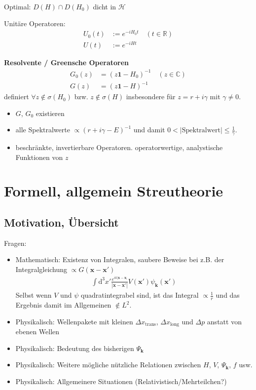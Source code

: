 \documentclass[11pt,a4paper]{report}
\begin{document}
Optimal: $D(H) \cap D(H_0)$ dicht in $\mathcal{H}$

Unitäre Operatoren: 
\begin{align*}
    U_0(t) &:= e^{-i H_0 t} \quad (t\in \mathbb{R}) \\
    U(t) &:= e^{-i H t}
\end{align*}

\textbf{Resolvente / Greensche Operatoren}
\begin{align*}
    G_0(z) &= (z \mathbf{1} - H_0)^{-1} \quad (z \in \mathbb{C}) \\
    G(z) &= (z \mathbf{1} - H)^{-1} 
\end{align*}
definiert $\forall z \notin \sigma(H_0)$ bzw. $z \notin \sigma(H)$ insbesondere für $z = r + i \gamma$ mit $\gamma \neq 0$.
\begin{itemize}
    \item $G$, $G_0$ existieren
    \item alle Spektralwerte $\propto (r + i \gamma - E)^{-1}$ und damit $0 < |\text{Spektralwert}| \leq \frac{1}{\gamma}$.
    \item beschränkte, invertierbare Operatoren. operatorwertige, analystische Funktionen von $z$
\end{itemize}

\section{Formell, allgemein Streutheorie}

\subsection{Motivation, Übersicht}

Fragen: 
\begin{itemize}
    \item Mathematisch: Existenz von Integralen, saubere Beweise bei z.B. der Integralgleichung $\propto G(\mathbf{x}- \mathbf{x}')$ 
    \begin{align*}
        \int \mathrm{d}^3 x' \frac{e^{i k |\mathbf{x} - \mathbf{x}_|}}{|\mathbf{x} - \mathbf{x}'|} V(\mathbf{x}') \psi_{\mathbf{k}} (\mathbf{x}')
    \end{align*}
    Selbst wenn $V$ und $\psi$ quadratintegrabel sind, ist das Integral $\propto \frac{1}{r}$ und das Ergebnis damit im Allgemeinen $\notin L^2$.
    \item Physikalisch: Wellenpakete mit kleinen $\Delta x_{\text{trans}}$, $\Delta x_{\text{long}}$ und $\Delta p$ anstatt von ebenen Wellen 
    \item Physikalisch: Bedeutung des bisherigen $\Psi_{\mathbf{k}}$
    \item Physikalisch: Weitere mögliche nützliche Relationen zwischen $H$, $V$, $\Psi_{\mathbf{k}}$, $f$ usw.
    \item Physikalisch: Allgemeinere Situationen (Relativistisch/Mehrteilchen?)
\end{itemize}
\end{document}
